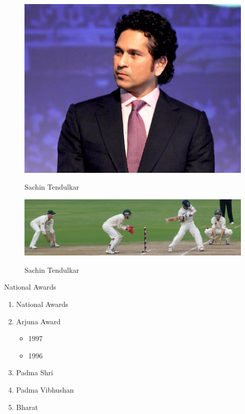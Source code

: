 \documentclass{report}
\begin{document}
\begin{figure}
	\centering
	\includegraphics[scale=0.5]{Sachin-01}
	\label{sachinface}
	\caption{Sachin Tendulkar}

\end{figure}

\begin{figure}
	\centering
	\includegraphics[scale=0.5]{Sachin-02}
	\label{sachinface}
	\caption{Sachin Tendulkar}
	
\end{figure}

National Awards
\begin{enumerate}
	\item National Awards
	\item Arjuna Award
		\begin{itemize}
			\item 1997
			\item 1996
		\end{itemize}
	\item Padma Shri
	\item Padma Vibhushan
	\item Bharat

\end{enumerate}
\end{document}
